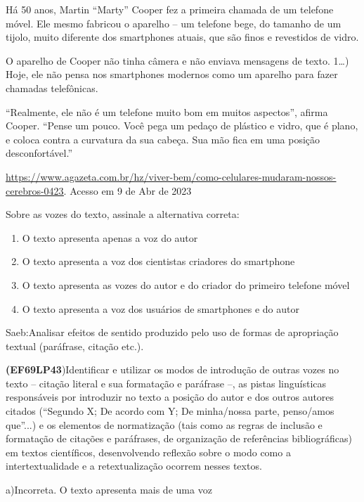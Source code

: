 {Há 50 anos, Martin ``Marty'' Cooper fez a primeira chamada de um
telefone móvel. Ele mesmo fabricou o aparelho -- um telefone bege, do
tamanho de um tijolo, muito diferente dos smartphones atuais, que são
finos e revestidos de vidro.

O aparelho de Cooper não tinha câmera e não enviava mensagens de texto.
1\ldots) Hoje, ele não pensa nos smartphones modernos como um aparelho
para fazer chamadas telefônicas.

``Realmente, ele não é um telefone muito bom em muitos aspectos'',
afirma Cooper. ``Pense um pouco. Você pega um pedaço de plástico e
vidro, que é plano, e coloca contra a curvatura da sua cabeça. Sua mão
fica em uma posição desconfortável.''

\href{https://www.agazeta.com.br/hz/viver-bem/como-celulares-mudaram-nossos-cerebros-0423}{\uline{https://www.agazeta.com.br/hz/viver-bem/como-celulares-mudaram-nossos-cerebros-0423}}.
Acesso em 9 de Abr de 2023

Sobre as vozes do texto, assinale a alternativa correta:

\begin{enumerate}
\def\labelenumi{\alph{enumi})}
\item
  O texto apresenta apenas a voz do autor
\item
  O texto apresenta a voz dos cientistas criadores do smartphone
\item
  O texto apresenta as vozes do autor e do criador do primeiro telefone
  móvel
\item
  O texto apresenta a voz dos usuários de smartphones e do autor
\end{enumerate}

Saeb:Analisar efeitos de sentido produzido pelo uso de formas de
apropriação textual (paráfrase, citação etc.).

\textbf{(EF69LP43})Identificar e utilizar os modos de introdução de
outras vozes no texto -- citação literal e sua formatação e paráfrase
--, as pistas linguísticas responsáveis por introduzir no texto a
posição do autor e dos outros autores citados (``Segundo X; De acordo
com Y; De minha/nossa parte, penso/amos que''...) e os elementos de
normatização (tais como as regras de inclusão e formatação de citações e
paráfrases, de organização de referências bibliográficas) em textos
científicos, desenvolvendo reflexão sobre o modo como a
intertextualidade e a retextualização ocorrem nesses textos.

a)Incorreta. O texto apresenta mais de uma voz

}
